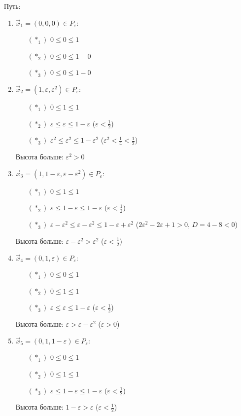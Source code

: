 \documentclass[a4paper]{article}
\def\eps{\varepsilon}
\begin{document}
Путь:\begin{enumerate}
\item $\vec{x}_1=(0,0,0)\in P_\eps$:\begin{enumerate}
\item[$(*_1)$] $0\leqslant 0\leqslant 1$
\item[$(*_2)$] $0\leqslant 0\leqslant 1-0$
\item[$(*_3)$] $0\leqslant 0\leqslant 1-0$
\end{enumerate}
\item $\vec{x}_2=(1,\eps,\eps^2)\in P_\eps$:\begin{enumerate}
\item[$(*_1)$] $0\leqslant 1\leqslant 1$
\item[$(*_2)$] $\eps\leqslant \eps\leqslant 1-\eps$ ($\eps<\frac{1}{2}$)
\item[$(*_3)$] $\eps^2\leqslant \eps^2\leqslant 1-\eps^2$ ($\eps^2<\frac{1}{4}<\frac{1}{2}$)
\end{enumerate}
Высота больше: $\eps^2>0$

\item $\vec{x}_3=(1,1-\eps,\eps-\eps^2)\in P_\eps$:\begin{enumerate}
\item[$(*_1)$] $0\leqslant 1\leqslant 1$
\item[$(*_2)$] $\eps\leqslant 1-\eps\leqslant 1-\eps$ ($\eps<\frac{1}{2}$)
\item[$(*_3)$] $\eps-\eps^2\leqslant \eps-\eps^2\leqslant 1-\eps+\eps^2$ ($2\eps^2-2\eps+1>0,\,D=4-8<0$)
\end{enumerate}
Высота больше: $\eps-\eps^2>\eps^2$ ($\eps<\frac{1}{2}$)

\item $\vec{x}_4=(0,1,\eps)\in P_\eps$:\begin{enumerate}
\item[$(*_1)$] $0 \leqslant 0 \leqslant 1$
\item[$(*_2)$] $0 \leqslant 1 \leqslant 1$
\item[$(*_3)$] $\eps \leqslant \eps \leqslant 1-\eps$ ($\eps<\frac{1}{2}$)
\end{enumerate}
Высота больше: $\eps>\eps-\eps^2$ ($\eps>0$)

\item $\vec{x}_5=(0,1,1-\eps)\in P_\eps$:\begin{enumerate}
\item[$(*_1)$] $0\leqslant 0 \leqslant 1$
\item[$(*_2)$] $0 \leqslant 1 \leqslant 1$
\item[$(*_3)$] $\eps \leqslant 1-\eps \leqslant 1-\eps$ ($\eps<\frac{1}{2}$)
\end{enumerate}
Высота больше: $1-\eps>\eps$ ($\eps<\frac{1}{2}$)


\end{enumerate}
\end{document}
